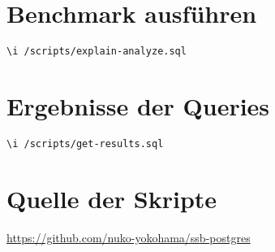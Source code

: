 \section{Benchmark ausführen}
\begin{lstlisting}[caption=Benchmark ausführen, label=code:runbenchmark]
\i /scripts/explain-analyze.sql
\end{lstlisting}

\section{Ergebnisse der Queries}
\begin{lstlisting}[caption=Ergebnisse der Queries abrufen, label=code:getresults]
\i /scripts/get-results.sql
\end{lstlisting}

\section{Quelle der Skripte}
\url{https://github.com/nuko-yokohama/ssb-postgres}~\cite{nukoyokohama_ssb-postgres_2023}
